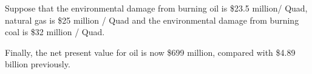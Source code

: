 \begin{enumerate}
\begin{Exercise}{Suppose that the environmental damage from burning oil is \$23.5 million/ Quad, natural gas is \$25 million / Quad and the environmental damage from burning coal is \$32 million / Quad.}
\begin{sol}
    Finally, the net present value for oil is now \$699 million, compared with \$4.89 billion previously.
          
    \end{sol} 
    
\end{Exercise}

\end{enumerate}



